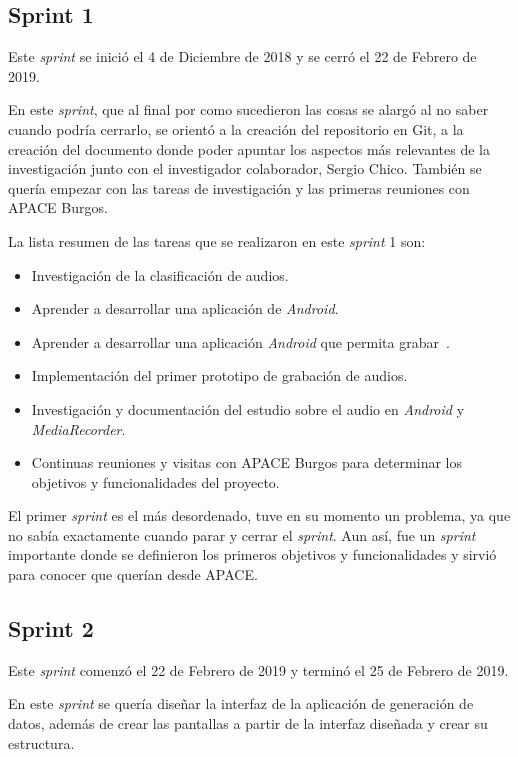 \subsection{Sprint 1}
Este \textit{sprint} se inició el 4 de Diciembre de 2018 y se cerró el 22 de Febrero de 2019.

En este \textit{sprint}, que al final por como sucedieron las cosas se alargó al no saber cuando podría cerrarlo, se orientó a la creación del repositorio en Git, a la creación del documento donde poder apuntar los aspectos más relevantes de la investigación junto con el investigador colaborador, Sergio Chico. También se quería empezar con las tareas de investigación y las primeras reuniones con APACE Burgos.

La lista resumen de las tareas que se realizaron en este \textit{sprint} 1 son:
\begin{itemize}
	\item Investigación de la clasificación de audios.
	\item Aprender a desarrollar una aplicación de \textit{Android}.
	\item Aprender a desarrollar una aplicación \textit{Android} que permita grabar~\cite{record}.
	\item Implementación del primer prototipo de grabación de audios.
	\item Investigación y documentación del estudio sobre el audio en \textit{Android} y \textit{MediaRecorder}.
	\item Continuas reuniones y visitas con APACE Burgos para determinar los objetivos y funcionalidades del proyecto.
\end{itemize}

El primer \textit{sprint} es el más desordenado, tuve en su momento un problema, ya que no sabía exactamente cuando parar y cerrar el \textit{sprint}. Aun así, fue un \textit{sprint} importante donde se definieron los primeros objetivos y funcionalidades y sirvió para conocer que querían desde APACE.

\subsection{Sprint 2}
Este \textit{sprint} comenzó el 22 de Febrero de 2019 y terminó el 25 de Febrero de 2019.

En este \textit{sprint} se quería diseñar la interfaz de la aplicación de generación de datos, además de crear las pantallas a partir de la interfaz diseñada y crear su estructura.

